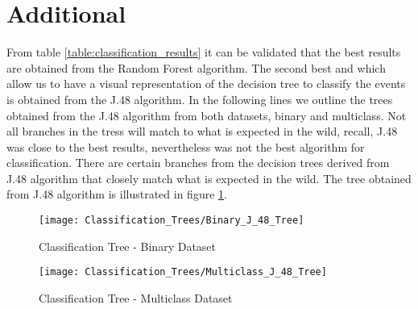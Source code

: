 \section{Additional}\label{Additional}


From table \ref{table:classification_results} it can be validated that the best results are obtained from the Random Forest algorithm. The second best and which allow us to have a visual representation of the decision tree to classify the events is obtained from the J.48 algorithm. In the following lines we outline the trees obtained from the J.48 algorithm from both datasets, binary and multiclass. Not all branches in the tress will match to what is expected in the wild, recall, J.48 was close to the best results, nevertheless was not the best algorithm for classification. There are certain branches from the decision trees derived from J.48 algorithm that closely match what is expected in the wild. The tree obtained from J.48 algorithm is illustrated in figure \ref{image:binary_classification_tree}.

\begin{figure}[h]
	\centering
	\texttt{[image: Classification\_Trees/Binary\_J\_48\_Tree]}
	\caption{Classification Tree - Binary Dataset}
	\label{image:binary_classification_tree}
\end{figure}

\begin{figure*}[b]
	\centering
	\texttt{[image: Classification\_Trees/Multiclass\_J\_48\_Tree]}
	\caption{Classification Tree - Multiclass Dataset}
	\label{image:multiclass_classification_tree}
\end{figure*}

